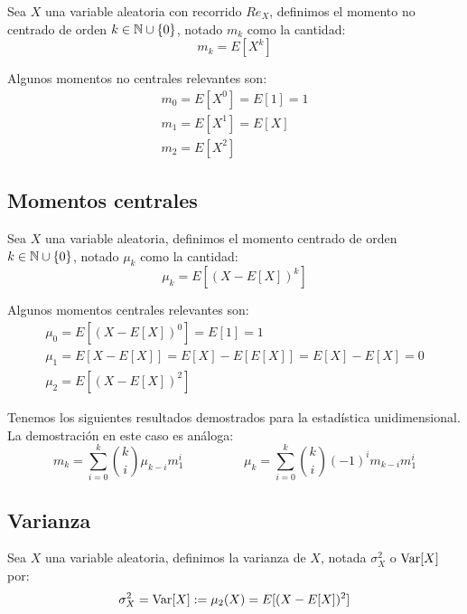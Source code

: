 \begin{definicion}
    Sea $X$ una variable aleatoria con recorrido $Re_X$, definimos el momento no centrado de orden $k \in \mathbb N \cup \{0\}$, notado $m_k$ como la cantidad:
    $$m_k = E[X^k]$$
\end{definicion}

Algunos momentos no centrales relevantes son:
$$\begin{array}{l}
    m_0 = E[X^0] = E[1] = 1 \\
    m_1 = E[X^1] = E[X]     \\
    m_2 = E[X^2]
\end{array}$$

\subsection{Momentos centrales}

\begin{definicion}
    Sea $X$ una variable aleatoria, definimos el momento centrado de orden $k \in \mathbb N \cup \{0\}$, notado $\mu_k$ como la cantidad:
    $$\mu_k = E[(X - E[X])^k]$$
\end{definicion}

Algunos momentos centrales relevantes son:
$$\begin{array}{l}
    \mu_0 = E[(X-E[X])^0] = E[1] = 1                     \\
    \mu_1 = E[X-E[X]] = E[X] - E[E[X]] = E[X] - E[X] = 0 \\
    \mu_2 = E[(X-E[X])^2]
  \end{array}$$

Tenemos los siguientes resultados demostrados para la estadística unidimensional. La demostración en este caso es análoga:
\begin{equation*}
    m_{k} = \sum_{i=0}^k\binom{k}{i} \mu_{k-i}m_1^i
    \hspace{2cm}
    \mu_{k} = \sum_{i=0}^k\binom{k}{i} (-1)^i m_{k-i} m_1^i
\end{equation*}

\subsection{Varianza}
\begin{definicion}
    Sea $X$ una variable aleatoria, definimos la varianza de $X$, notada $\sigma_X^2$ o $\operatorname{Var}[X]$ por:
    $$\sigma_X^2 = \operatorname{Var}[X] := \mu_2(X) = E[(X-E[X])^2]$$
\end{definicion}


